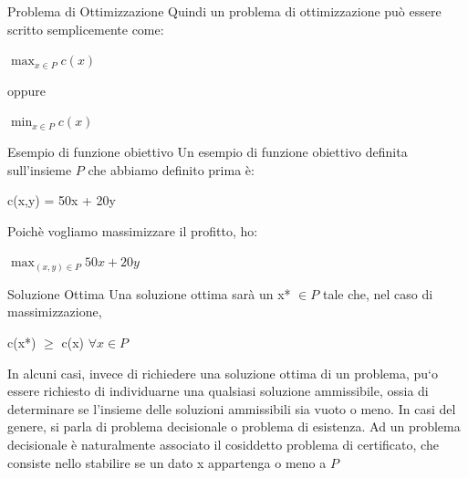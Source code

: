 \begin{definition}{Problema di Ottimizzazione}
    Quindi un problema di ottimizzazione può essere scritto semplicemente come:
    \begin{center}
        $\max_{x \in P} c(x)$
    \end{center}
    oppure
    \begin{center}
        $\min_{x \in P} c(x)$
    \end{center}
\end{definition}
\begin{example}{Esempio di funzione obiettivo}
    Un esempio di funzione obiettivo definita sull'insieme $P$ che abbiamo definito prima è:
    \begin{center}
        c(x,y) = 50x + 20y
    \end{center}
    Poichè vogliamo massimizzare il profitto, ho:
    \begin{center}
         $\max_{(x,y) \in P} 50x + 20y$
    \end{center}
\end{example}
\begin{definition}{Soluzione Ottima}
    Una soluzione ottima sarà un x* $\in P$ tale che, nel caso di massimizzazione,
    \begin{center}
        c(x*) $\geq$ c(x) $\forall x \in P$ 
    \end{center}
\end{definition}
In alcuni casi, invece di richiedere una soluzione ottima di un problema,
pu`o essere richiesto di individuarne una qualsiasi soluzione ammissibile, ossia
di determinare se l'insieme delle soluzioni ammissibili sia vuoto o meno. In
casi del genere, si parla di problema decisionale o problema di esistenza.
Ad un problema decisionale è naturalmente associato il cosiddetto problema
di certificato, che consiste nello stabilire se un dato x appartenga o meno a $P$
